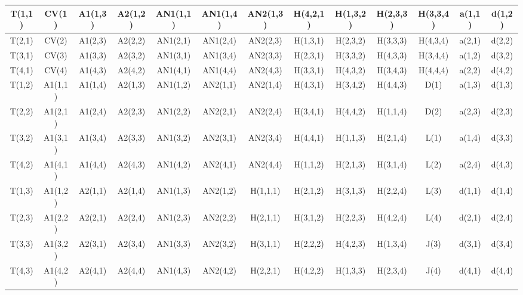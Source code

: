 \documentclass{article}
\begin{document}
\begin{center}
\begin{tabular}{|c|c|c|c|c|c|c|c|c|c|c|c|c|}
\hline
T(1,1) & CV(1) & A{1}(1,3) & A{2}(1,2) & AN{1}(1,1) & AN{1}(1,4) & AN{2}(1,3) & H(4,2,1) & H(1,3,2) & H(2,3,3) & H(3,3,4) & a(1,1) & d(1,2) \\
\hline
T(2,1) & CV(2) & A{1}(2,3) & A{2}(2,2) & AN{1}(2,1) & AN{1}(2,4) & AN{2}(2,3) & H(1,3,1) & H(2,3,2) & H(3,3,3) & H(4,3,4) & a(2,1) & d(2,2) \\
\hline
T(3,1) & CV(3) & A{1}(3,3) & A{2}(3,2) & AN{1}(3,1) & AN{1}(3,4) & AN{2}(3,3) & H(2,3,1) & H(3,3,2) & H(4,3,3) & H(3,4,4) & a(1,2) & d(3,2) \\
\hline
T(4,1) & CV(4) & A{1}(4,3) & A{2}(4,2) & AN{1}(4,1) & AN{1}(4,4) & AN{2}(4,3) & H(3,3,1) & H(4,3,2) & H(3,4,3) & H(4,4,4) & a(2,2) & d(4,2) \\
\hline
T(1,2) & A{1}(1,1) & A{1}(1,4) & A{2}(1,3) & AN{1}(1,2) & AN{2}(1,1) & AN{2}(1,4) & H(4,3,1) & H(3,4,2) & H(4,4,3) & D(1) & a(1,3) & d(1,3) \\
\hline
T(2,2) & A{1}(2,1) & A{1}(2,4) & A{2}(2,3) & AN{1}(2,2) & AN{2}(2,1) & AN{2}(2,4) & H(3,4,1) & H(4,4,2) & H(1,1,4) & D(2) & a(2,3) & d(2,3) \\
\hline
T(3,2) & A{1}(3,1) & A{1}(3,4) & A{2}(3,3) & AN{1}(3,2) & AN{2}(3,1) & AN{2}(3,4) & H(4,4,1) & H(1,1,3) & H(2,1,4) & L(1) & a(1,4) & d(3,3) \\
\hline
T(4,2) & A{1}(4,1) & A{1}(4,4) & A{2}(4,3) & AN{1}(4,2) & AN{2}(4,1) & AN{2}(4,4) & H(1,1,2) & H(2,1,3) & H(3,1,4) & L(2) & a(2,4) & d(4,3) \\
\hline
T(1,3) & A{1}(1,2) & A{2}(1,1) & A{2}(1,4) & AN{1}(1,3) & AN{2}(1,2) & H(1,1,1) & H(2,1,2) & H(3,1,3) & H(2,2,4) & L(3) & d(1,1) & d(1,4) \\
\hline
T(2,3) & A{1}(2,2) & A{2}(2,1) & A{2}(2,4) & AN{1}(2,3) & AN{2}(2,2) & H(2,1,1) & H(3,1,2) & H(2,2,3) & H(4,2,4) & L(4) & d(2,1) & d(2,4) \\
\hline
T(3,3) & A{1}(3,2) & A{2}(3,1) & A{2}(3,4) & AN{1}(3,3) & AN{2}(3,2) & H(3,1,1) & H(2,2,2) & H(4,2,3) & H(1,3,4) & J(3) & d(3,1) & d(3,4) \\
\hline
T(4,3) & A{1}(4,2) & A{2}(4,1) & A{2}(4,4) & AN{1}(4,3) & AN{2}(4,2) & H(2,2,1) & H(4,2,2) & H(1,3,3) & H(2,3,4) & J(4) & d(4,1) & d(4,4) \\
\hline
\end{tabular}
\end{center}
\end{document}
